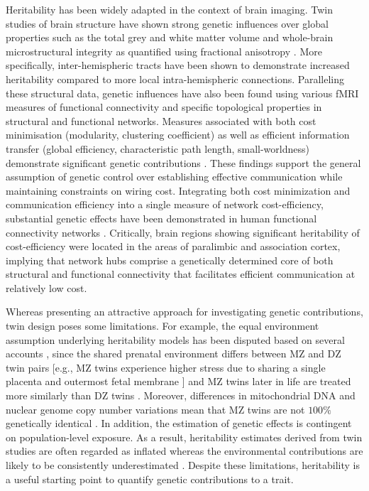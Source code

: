 Heritability has been widely adapted in the context of brain imaging. Twin studies of brain structure have shown strong genetic influences over global properties such as the total grey and white matter volume 
\citep{Baare2001,Bohlken2014,Wright2002} and whole-brain microstructural integrity as quantified using fractional anisotropy \citep{Bohlken2014}. More specifically, inter-hemispheric tracts have been shown to demonstrate increased heritability \citep{Shen2014,Sudre2017} compared to more local intra-hemispheric connections. Paralleling these structural data, genetic influences have also been found using various fMRI measures of functional connectivity \citep{Colclough2017} \citep{Fu2015,Glahn2010,Sudre2017} and specific topological properties in structural \citep{Bohlken2014} and functional \citep{Fornito2011,Sinclair2015}  networks. Measures associated with both cost minimisation (modularity, clustering coefficient) as well as efficient information transfer (global efficiency, characteristic path length, small-worldness) demonstrate significant genetic contributions \citep{Sinclair2015,Bohlken2014}. These findings support the general assumption of genetic control over establishing effective communication while maintaining constraints on wiring cost. Integrating both cost minimization and communication efficiency into a single measure of network cost-efficiency, substantial genetic effects have been demonstrated in human functional connectivity networks \citep{Fornito2011}. Critically, brain regions showing significant heritability of cost-efficiency were located in the areas of paralimbic and association cortex, implying that network hubs comprise a genetically determined core of both structural and functional connectivity that facilitates efficient communication at relatively low cost.  

Whereas presenting an attractive approach for investigating genetic contributions, twin design poses some limitations. For example, the equal environment assumption underlying heritability models has been disputed based on several accounts \citep{Charney2017,Joseph2002}, since the shared prenatal environment differs between MZ and DZ twin pairs [e.g., MZ twins experience higher stress due to sharing a single placenta and outermost fetal membrane \citep{Corsello2010}] and MZ twins later in life are treated more similarly than DZ twins \citep{Joseph2002}. Moreover, differences in mitochondrial DNA and nuclear genome copy number variations mean that MZ twins are not $100\%$ genetically identical \citep{Bruder2008,Charney2017}. In addition, the estimation of genetic effects is contingent on population-level exposure. As a result, heritability estimates derived from twin studies are often regarded as inflated whereas the environmental contributions are likely to be consistently underestimated \citep{Joseph2002}. Despite these limitations, heritability is a useful starting point to quantify genetic contributions to a trait. 

